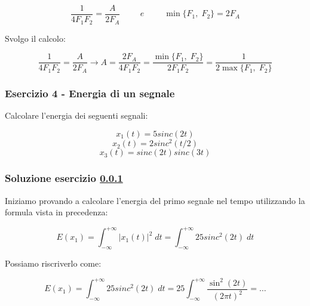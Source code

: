 \documentclass[../main.tex]{subfiles}
\begin{document}
\begin{equation}
\frac{1}{4 F_1F_2} = \frac{A}{2F_A} \hspace{1cm} \unit{e} \hspace{1cm} \min\{ F_1,\; F_2 \} = 2F_A
\end{equation}

Svolgo il calcolo:

\begin{equation}
	\frac{1}{4 F_1F_2} = \frac{A}{2F_A} \rightarrow A = \frac{2F_A}{4F_1F_2} = \frac{\min\{ F_1,\; F_2 \}}{2F_1F_2} = \frac{1}{ 2 \max\{ F_1,\; F_2 \}} 
\end{equation}




\vspace*{1.5cm}
\subsubsection{Esercizio 4 - Energia di un segnale} 
\label{ss24}

Calcolare l'energia dei seguenti segnali:

\begin{equation*}
	x_1(t) = 5 \unit{sinc}(2t) 
\end{equation*}
\begin{equation*}
	x_2(t) = 2 \unit{sinc}^2(t/2) 
\end{equation*}
\begin{equation*}
	x_3(t) = \unit{sinc}(2t)\unit{sinc}(3t)
\end{equation*}
	

\subsubsection*{Soluzione esercizio \ref{ss24}}

Iniziamo provando a calcolare l'energia del primo segnale nel tempo utilizzando la formula vista in precedenza:

\begin{equation}
	E(x_1) = \int_{ - \infty}^{ + \infty} |x_1(t)|^2 \;dt = \int_{ - \infty}^{ + \infty} 25 \unit{sinc}^2(2t)\;dt
\end{equation} 

Possiamo riscriverlo come:


\begin{equation}
	E(x_1) = \int_{ - \infty}^{ + \infty} 25 \unit{sinc}^2(2t)\;dt = 25 \int_{ - \infty}^{ + \infty} \frac{\sin^2(2t)}{(2\pi t)^2} = \dots
\end{equation} 
\end{document}
